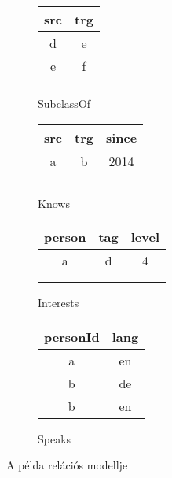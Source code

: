 \begin{figure}[htb]
	\begin{subfigure}[b]{0.2\textwidth}
		\begin{center}
			\begin{tabular}{|c|c|}
				\hline
				src & trg\\
				\hline
				d & e \\
				\hline
				e & f \\
				\hline \\
			\end{tabular}
			\caption{\textsf{SubclassOf}}
			\label{example-rdb-subclassOf}
		\end{center}
	\end{subfigure}
	\begin{subfigure}[b]{0.26\textwidth}
		\begin{center}
			\begin{tabular}{|c|c|c|}
				\hline
				src & trg & since\\
				\hline
				a & b & 2014 \\
				\hline \\ \\
			\end{tabular}
			\caption{\textsf{Knows}}
			\label{example-rdb-knows}
		\end{center}
	\end{subfigure}
	\begin{subfigure}[b]{0.28\textwidth}
		\begin{center}
			\begin{tabular}{|c|c|c|}
				\hline
				person & tag & level\\
				\hline
				a & d & 4 \\
				\hline \\ \\
			\end{tabular}
			\caption{\textsf{Interests}}
			\label{example-rdb-interests}
		\end{center}
	\end{subfigure}
	\begin{subfigure}[b]{0.24\textwidth}
	\begin{center}
		\begin{tabular}{|c|c|}
			\hline
			personId & lang\\
			\hline
			a & en \\
			\hline
			b & de \\
			\hline
			b & en \\
			\hline
		\end{tabular}
		\caption{\textsf{Speaks}}
		\label{example-rdb-speaks}
	\end{center}
	\end{subfigure}

	\caption{A példa relációs modellje}
	\label{fig:example-rdb}
\end{figure}


